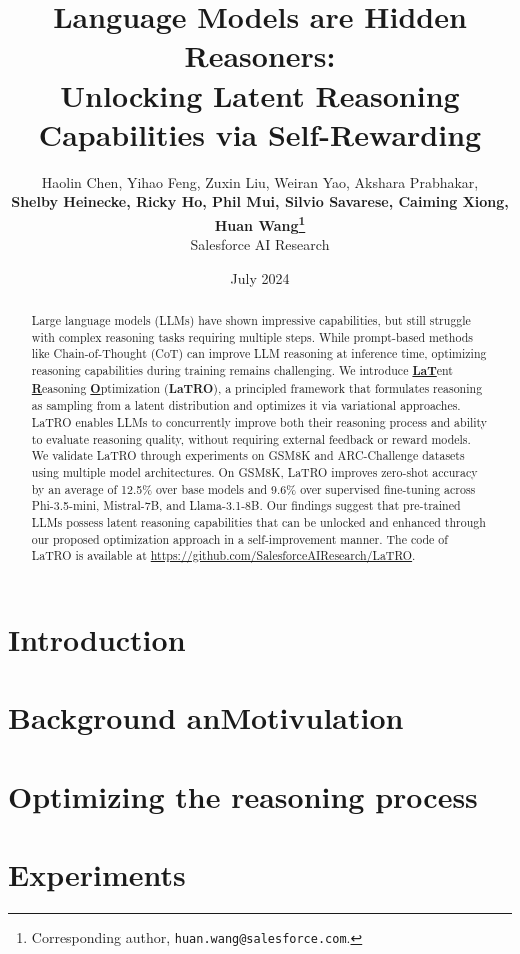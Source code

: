\documentclass{article}
\title{Language Models are Hidden Reasoners:\\Unlocking Latent Reasoning Capabilities via Self-Rewarding}
\author{Haolin Chen, Yihao Feng, Zuxin Liu, Weiran Yao, Akshara Prabhakar, \\
\textbf{Shelby Heinecke, Ricky Ho, Phil Mui, Silvio Savarese, Caiming Xiong, Huan Wang\thanks{Corresponding author, \texttt{huan.wang@salesforce.com}.}} \\
Salesforce AI Research \\
}
\date{July 2024}
\newcommand{\methodfull}{\textbf{\underline{LaT}}ent \textbf{\underline{R}}easoning \textbf{\underline{O}}ptimization (\textbf{LaTRO})}
\begin{document}
\maketitle
\begin{abstract}
    Large language models (LLMs) have shown impressive capabilities, but still struggle with complex reasoning tasks requiring multiple steps. While prompt-based methods like Chain-of-Thought (CoT) can improve LLM reasoning at inference time, optimizing reasoning capabilities during training remains challenging. We introduce \methodfull, a principled framework that formulates reasoning as sampling from a latent distribution and optimizes it via variational approaches. LaTRO enables LLMs to concurrently improve both their reasoning process and ability to evaluate reasoning quality, without requiring external feedback or reward models. We validate LaTRO through experiments on GSM8K and ARC-Challenge datasets using multiple model architectures. On GSM8K, LaTRO improves zero-shot accuracy by an average of 12.5\% over base models and 9.6\% over supervised fine-tuning across Phi-3.5-mini, Mistral-7B, and Llama-3.1-8B. Our findings suggest that pre-trained LLMs possess latent reasoning capabilities that can be unlocked and enhanced through our proposed optimization approach in a self-improvement manner. The code of LaTRO is available at \url{https://github.com/SalesforceAIResearch/LaTRO}.
\end{abstract}

\section{Introduction}




\section{Background anMotivulation}
\label{sec:background}


\section{Optimizing the reasoning process}




\section{Experiments}


\label{sec:conclusion_future_work}






\clearpage
\newpage

\appendix

\end{document}
